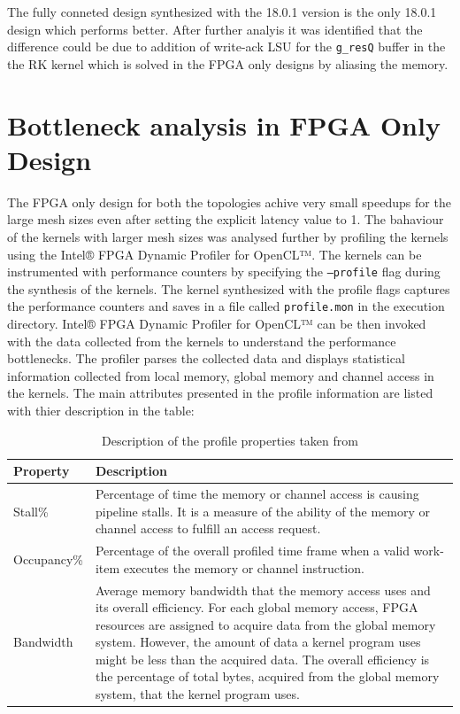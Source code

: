 The fully conneted design synthesized with the 18.0.1 version is the only
18.0.1 design which performs better. After further analyis it was identified that
the difference could be due to addition of write-ack LSU for the \texttt{g\_resQ}
buffer in the the RK kernel which is solved in the FPGA only designs by aliasing
the memory.


\section{Bottleneck analysis in FPGA Only Design}

The FPGA only design for both the topologies achive very small speedups for the large mesh sizes
even after setting the explicit latency value to 1. The bahaviour of the kernels with larger mesh
sizes was analysed further by profiling the kernels using the Intel® FPGA Dynamic Profiler for OpenCL™.
The kernels can be instrumented with performance counters by specifying the \texttt{--profile} flag
during the synthesis of the kernels. The kernel synthesized with the profile flags captures the
performance counters and saves in a file called \texttt{profile.mon} in the execution directory.
Intel® FPGA Dynamic Profiler for OpenCL™ can be then invoked with the data collected from the
kernels to understand the performance bottlenecks. The profiler parses the collected data and
displays statistical information collected from local memory, global memory and channel
access in the kernels. The main attributes presented in the profile information are
listed with thier description in the table:
\begin{table}[ht]%
    \centering
    \caption{Description of the profile properties taken from \cite{noauthor_intel_2019}}
    \label{tab:profile_descr}
    \begin{tabular}{lp{11cm}}
    \textbf{Property} & \textbf{Description} \\
    \hline
    Stall\% & Percentage of time the memory or channel
    access is causing pipeline stalls. It is a measure of the ability
    of the memory or channel access to fulfill an access request. \\
    \hline
    Occupancy\% & Percentage of the overall profiled time frame
    when a valid work-item executes the memory or channel instruction. \\
    \hline
    Bandwidth & Average memory bandwidth that the memory access
    uses and its overall efficiency. For each global memory access,
    FPGA resources are assigned to acquire data from the global
    memory system. However, the amount of data a kernel program
    uses might be less than the acquired data. The overall
    efficiency is the percentage of total bytes, acquired
    from the global memory system, that the kernel program uses.\\
    \hline
    \end{tabular}%
\end{table}

